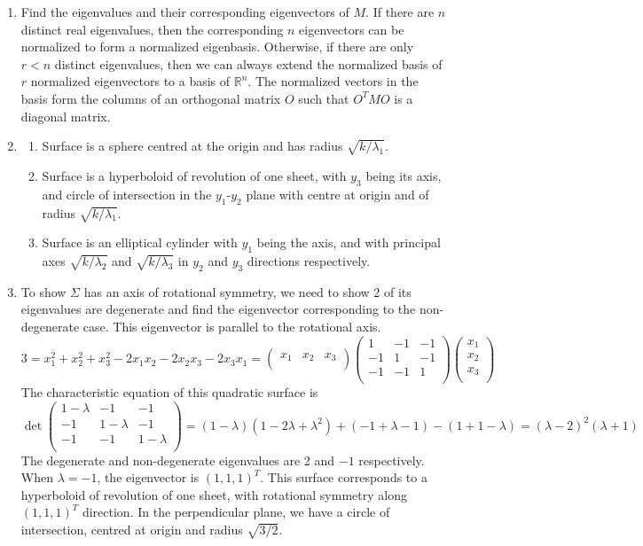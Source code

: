 \documentclass[a4paper]{article}
\begin{document}
\begin{ans}\leavevmode
\begin{enumerate}[label=(\roman*)]
\item Find the eigenvalues and their corresponding eigenvectors of $M$. If there are $n$ distinct real eigenvalues, then the corresponding $n$ eigenvectors can be normalized to form a normalized eigenbasis. Otherwise, if there are only $r<n$ distinct eigenvalues, then we can always extend the normalized basis of $r$ normalized eigenvectors to a basis of $\mathbb{R}^n$. The normalized vectors in the basis form the columns of an orthogonal matrix $O$ such that $O^TMO$ is a diagonal matrix.
\item
\begin{enumerate}[label=(\alph*)]
\item Surface is a sphere centred at the origin and has radius $\sqrt{k/\lambda_1}$.
\item Surface is a hyperboloid of revolution of one sheet, with $y_3$ being its axis, and circle of intersection in the $y_1$-$y_2$ plane with centre at origin and of radius $\sqrt{k/\lambda_1}$.
\item Surface is an elliptical cylinder with $y_1$ being the axis, and with principal axes $\sqrt{k/\lambda_2}$ and $\sqrt{k/\lambda_3}$ in $y_2$ and $y_3$ directions respectively.
\end{enumerate}
\item To show $\Sigma$ has an axis of rotational symmetry, we need to show 2 of its eigenvalues are degenerate and find the eigenvector corresponding to the non-degenerate case. This eigenvector is parallel to the rotational axis.
$$3=x_1^2+x_2^2+x_3^2-2x_1x_2-2x_2x_3-2x_3x_1=\begin{pmatrix}x_1&x_2&x_3\\\end{pmatrix}\begin{pmatrix}1&-1&-1\\-1&1&-1\\-1&-1&1\\\end{pmatrix}\begin{pmatrix}x_1\\x_2\\x_3\\\end{pmatrix}$$
The characteristic equation of this quadratic surface is
$$\det\begin{pmatrix}1-\lambda&-1&-1\\-1&1-\lambda&-1\\-1&-1&1-\lambda\\\end{pmatrix}=(1-\lambda)(1-2\lambda+\lambda^2)+(-1+\lambda-1)-(1+1-\lambda)=(\lambda-2)^2(\lambda+1)$$
The degenerate and non-degenerate eigenvalues are 2 and $-1$ respectively. When $\lambda=-1$, the eigenvector is $(1,1,1)^T$. This surface corresponds to a hyperboloid of revolution of one sheet, with rotational symmetry along $(1,1,1)^T$ direction. In the perpendicular plane, we have a circle of intersection, centred at origin and radius $\sqrt{3/2}$.
\end{enumerate}
\end{ans}
\end{document}
